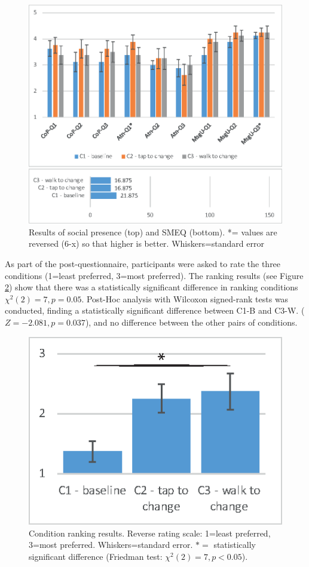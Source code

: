 \begin{figure}[ht]
  \centering
  \includegraphics[width=\columnwidth]{images/52-data-chi/images-01.eps}
  \caption{Results of social presence (top) and SMEQ (bottom). *= values are reversed (6-x) so that higher is better. Whiskers=standard error}
  \label{fig:data:results}
\end{figure}

As part of the post-questionnaire, participants were asked to rate the three conditions (1=least preferred, 3=most preferred). The ranking results (see Figure \ref{fig:data:ranking}) show that there was a statistically significant difference in ranking conditions $\chi^2(2)=7, p=0.05$. Post-Hoc analysis with Wilcoxon signed-rank tests was conducted, finding a statistically significant difference between C1-B and C3-W. ($Z=-2.081, p=0.037$), and no difference between the other pairs of conditions.

\begin{figure}[ht]
  \centering
  \includegraphics[width=.8\linewidth]{images/52-data-chi/images-05.eps}
  \caption{Condition ranking results. Reverse rating scale: 1=least preferred, 3=most preferred. Whiskers=standard error. $*=$ statistically significant difference (Friedman test: $\chi^2(2)=7, p<0.05$).}  
      \label{fig:data:ranking}
\end{figure}

